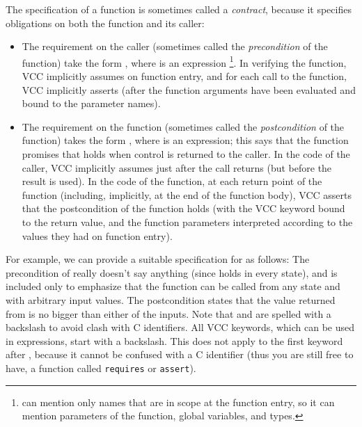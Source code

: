 The specification of a function is sometimes called a \emph{contract},
because it specifies obligations on both the function and its caller:
\begin{itemize}
\item The requirement on the caller (sometimes called the
  \emph{precondition} of the function) take the form 
  , 
  where  is an expression%
  \footnote{
     can mention only names that are in scope at the function entry, 
    so it can mention parameters of the function, global variables, and
    types.}.  
  In verifying the function, VCC implicitly assumes
   on function entry, and for each call to the function, VCC
  implicitly asserts  (after the function arguments have been
  evaluated and bound to the parameter names).

\item The requirement on the function (sometimes called the
  \emph{postcondition} of the function) takes the form
  , where  is an expression; this says that
  the function promises that  holds when control is returned to
  the caller.  In the code of the caller, VCC implicitly assumes 
  just after the call returns (but
  before the result is used). In the code of the function, at each return
  point of the function (including, implicitly,
  at the end of the function body), VCC asserts that the postcondition
  of the function holds (with the VCC keyword \vcc{\result} bound to the
  return value, and the function parameters 
  interpreted according to the values they had on function entry).
\end{itemize}

For example, we can provide a suitable specification for  as
follows:
\noindent
The precondition  of  really doesn't say
anything (since \vcc{\true} holds in every state), and is included
only to emphasize that the function can be called from any state and
with arbitrary input values.
The postcondition states that the value returned from  
is no bigger than either of the inputs.
Note that \vcc{\true} and \vcc{\result} are spelled with a backslash
to avoid clash with C identifiers.
All VCC keywords, which can be used in expressions, start with a backslash.
This does not apply to the first keyword after \vcc{_}, because it cannot
be confused with a C identifier (thus you are still free to have, \eg
a function called \texttt{requires} or \texttt{assert}).

